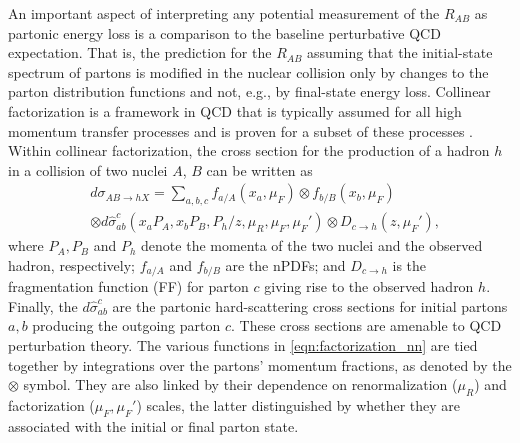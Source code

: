 \documentclass[%
 reprint,
 amsmath,amssymb,
 aps,
 prl,nofootinbib,
 superscriptaddress
]{revtex4-2}
\begin{document}
 An important aspect of interpreting any potential measurement of the $R_{AB}$ as partonic energy loss is a comparison to the baseline perturbative QCD expectation. That is, the prediction for the $R_{AB}$ assuming that the initial-state spectrum of partons is modified in the nuclear collision only by changes to the parton distribution functions and not, e.g., by final-state energy loss. Collinear factorization is a framework in QCD that is typically assumed for all high momentum transfer processes and is proven for a subset of these processes \cite{Collins:1989gx}. Within collinear factorization, the cross section for the production of a hadron $h$ in a collision of two nuclei $A$, $B$ can be written as
\begin{align}
	&d\sigma_{AB\to hX} = \sum_{a,b,c} f_{a/A}(x_a,\mu_F) \otimes f_{b/B}(x_b,\mu_F)\label{eqn:factorization_nn}\\
	&\otimes d\hat{\sigma}_{ab}^c(x_aP_A,x_b P_B,P_h/z,\mu_R,\mu_F,\mu_F') \otimes D_{c \to h}(z,\mu_F'),\nonumber
\end{align}
where $P_A,P_B$ and $P_h$ denote the momenta of the two nuclei and the observed hadron, respectively; 
$f_{a/A}$ and $f_{b/B}$ are the nPDFs; and $D_{c \to h}$ is the fragmentation function (FF) for parton $c$ giving rise to the observed hadron $h$. Finally, the $d\hat{\sigma}_{ab}^c$ are the partonic hard-scattering cross sections for initial partons $a,b$ producing the outgoing parton $c$. These cross sections are amenable to QCD perturbation theory. The various functions in \cref{eqn:factorization_nn} are tied together by integrations over the partons' momentum fractions, as denoted by the $\otimes$ symbol. They are also linked by their dependence on renormalization ($\mu_R$) and factorization ($\mu_F,\mu_F'$) scales, the latter distinguished by whether they are associated with the initial or final parton state. 
\end{document}
